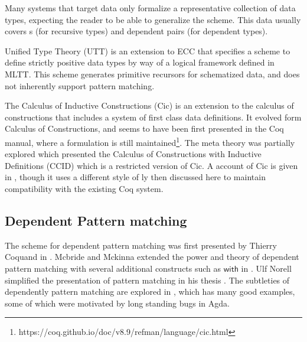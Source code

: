 Many systems that target data only formalize a representative collection of data types, expecting the reader to be able to generalize the scheme.
This data usually covers \Nat{}s (for recursive types) and dependent pairs (for dependent types). %



Unified Type Theory (\ac{UTT})\cite{luo1990extended,luo1994computation} is an extension to \ac{ECC} that specifies a scheme to define strictly positive data types by way of a logical framework defined in \ac{MLTT}.
This scheme generates primitive recursors for schematized data, and does not inherently support pattern matching.

The Calculus of Inductive Constructions (\ac{Cic}) is an extension to the calculus of constructions that includes a system of first class data definitions.
It evolved form Calculus of Constructions, and seems to have been first presented in the Coq manual, where a formulation is still maintained\footnote{https://coq.github.io/doc/v8.9/refman/language/cic.html}.
The meta theory was partially explored \cite{10.1007/BFb0037116} which presented the  Calculus of Constructions with Inductive Definitions (CCID) which is a restricted version of \ac{Cic}.
A \bidir{} account of \ac{Cic} is given in \cite{lennonbertrand:LIPIcs.ITP.2021.24}, though it uses a different style of \bidir{}ly then discussed here to maintain compatibility with the existing Coq system.


\subsection{Dependent Pattern matching}


The scheme for dependent pattern matching was first presented by Thierry Coquand in \cite{coquand1992pattern}.
Mcbride and Mckinna extended the power and theory of dependent pattern matching with several additional constructs such as $\mathsf{with}$ in \cite{mcbride_mckinna_2004}.
Ulf Norell simplified the presentation of pattern matching in his thesis \cite{norell2007towards}.
The subtleties of dependently pattern matching are explored in \cite{cockx_devriese_2018}, which has many good examples, some of which were motivated by long standing bugs in Agda.

